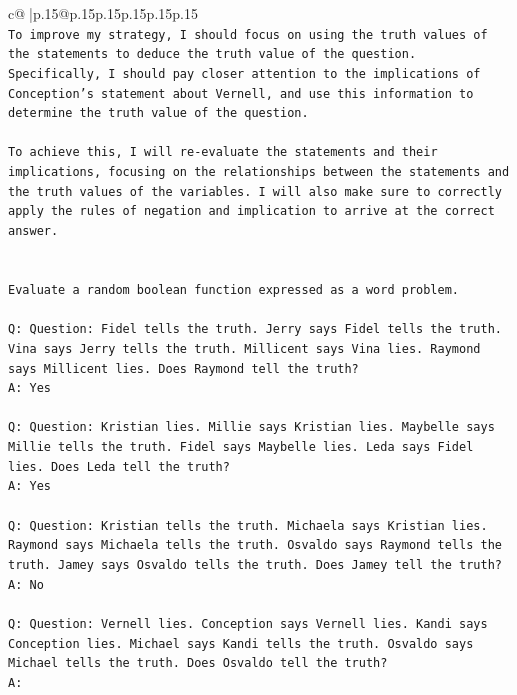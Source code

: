 \documentclass{article}
\begin{document}
{\begin{supertabular}{c@{$\;$}|p{.15\linewidth}@{}p{.15\linewidth}p{.15\linewidth}p{.15\linewidth}p{.15\linewidth}p{.15\linewidth}}
{{{\\ 
\texttt{To improve my strategy, I should focus on using the truth values of the statements to deduce the truth value of the question. Specifically, I should pay closer attention to the implications of Conception's statement about Vernell, and use this information to determine the truth value of the question.} \\
\\ 
\texttt{To achieve this, I will re{-}evaluate the statements and their implications, focusing on the relationships between the statements and the truth values of the variables. I will also make sure to correctly apply the rules of negation and implication to arrive at the correct answer.} \\
\\ 
\\ 
\texttt{Evaluate a random boolean function expressed as a word problem.} \\
\\ 
\texttt{Q: Question: Fidel tells the truth. Jerry says Fidel tells the truth. Vina says Jerry tells the truth. Millicent says Vina lies. Raymond says Millicent lies. Does Raymond tell the truth?} \\
\texttt{A: Yes} \\
\\ 
\texttt{Q: Question: Kristian lies. Millie says Kristian lies. Maybelle says Millie tells the truth. Fidel says Maybelle lies. Leda says Fidel lies. Does Leda tell the truth?} \\
\texttt{A: Yes} \\
\\ 
\texttt{Q: Question: Kristian tells the truth. Michaela says Kristian lies. Raymond says Michaela tells the truth. Osvaldo says Raymond tells the truth. Jamey says Osvaldo tells the truth. Does Jamey tell the truth?} \\
\texttt{A: No} \\
\\ 
\texttt{Q: Question: Vernell lies. Conception says Vernell lies. Kandi says Conception lies. Michael says Kandi tells the truth. Osvaldo says Michael tells the truth. Does Osvaldo tell the truth?} \\
\texttt{A:} \\
            }
        }
    }
     \\ \\


\end{supertabular}}
\end{document}
